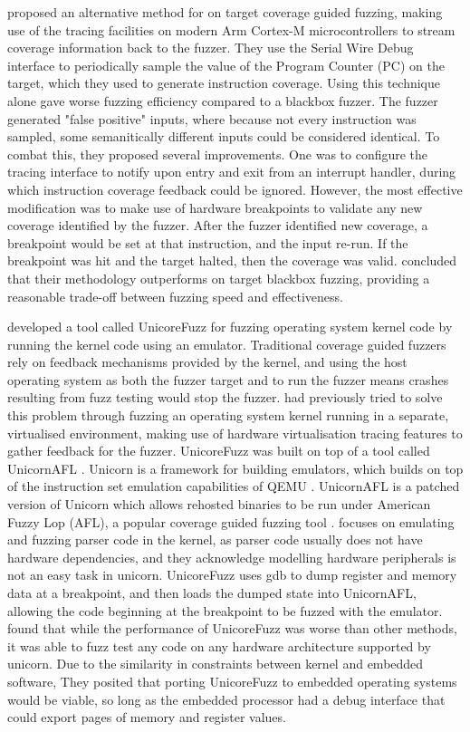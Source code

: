 \documentclass[../report.tex]{subfiles}
\begin{document}
\citet{Beckmann_2023} proposed an alternative method for on target coverage
guided fuzzing, making use of the tracing facilities on modern Arm Cortex-M
microcontrollers to stream coverage information back to the fuzzer. They use
the Serial Wire Debug interface to periodically sample the value of the Program
Counter (PC) on the target, which they used to generate instruction coverage.
Using this technique alone gave worse fuzzing efficiency compared to a blackbox
fuzzer. The fuzzer generated "false positive" inputs, where because not every
instruction was sampled, some semanitically different inputs could be
considered identical. To combat this, they proposed several improvements. One
was to configure the tracing interface to notify upon entry and exit from an
interrupt handler, during which instruction coverage feedback could be ignored.
However, the most effective modification was to make use of hardware
breakpoints to validate any new coverage identified by the fuzzer. After the
fuzzer identified new coverage, a breakpoint would be set at that instruction,
and the input re-run. If the breakpoint was hit and the target halted, then the
coverage was valid. \citet{Beckmann_2023} concluded that their methodology
outperforms on target blackbox fuzzing, providing a reasonable trade-off
between fuzzing speed and effectiveness.

\citet{Maier_2019} developed a tool called UnicoreFuzz for fuzzing operating
system kernel code by running the kernel code using an emulator. Traditional
coverage guided fuzzers rely on feedback mechanisms provided by the kernel, and
using the host operating system as both the fuzzer target and to run the fuzzer
means crashes resulting from fuzz testing would stop the fuzzer.
\citet{kAFL_2017} had previously tried to solve this problem through fuzzing an
operating system kernel running in a separate, virtualised environment, making
use of hardware virtualisation tracing features to gather feedback for the
fuzzer. UnicoreFuzz was built on top of a tool called UnicornAFL
\citep{Maier_2019}. Unicorn is a framework for building emulators, which builds
on top of the instruction set emulation capabilities of QEMU \citep{Unicorn}.
UnicornAFL is a patched version of Unicorn which allows rehosted binaries to be
run under American Fuzzy Lop (AFL), a popular coverage guided fuzzing tool
\citep{UnicornMode, AFL_2019}.
\citet{Maier_2019} focuses on emulating and fuzzing parser code in the kernel,
as parser code usually does not have hardware dependencies, and they
acknowledge modelling hardware peripherals is not an easy task in unicorn.
UnicoreFuzz uses gdb to dump register and memory data at a breakpoint, and then
loads the dumped state into UnicornAFL, allowing the code beginning at the
breakpoint to be fuzzed with the emulator. \citet{Maier_2019} found that while
the performance of UnicoreFuzz was worse than other methods, it was able to
fuzz test any code on any hardware architecture supported by unicorn. Due to
the similarity in constraints between kernel and embedded software, They
posited that porting UnicoreFuzz to embedded operating systems would be viable,
so long as the embedded processor had a debug interface that could export pages
of memory and register values.
\end{document}
